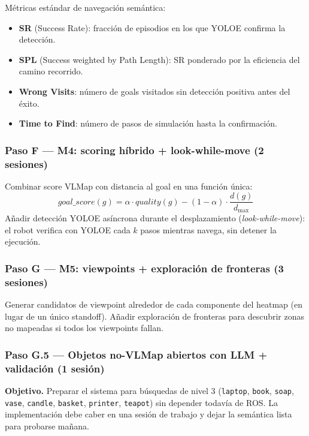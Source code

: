 \documentclass[11pt,a4paper]{article}
\begin{document}
Métricas estándar de navegación semántica:
\begin{itemize}
  \item \textbf{SR} (Success Rate): fracción de episodios en los que YOLOE confirma
        la detección.
  \item \textbf{SPL} (Success weighted by Path Length): SR ponderado por la eficiencia
        del camino recorrido.
  \item \textbf{Wrong Visits}: número de goals visitados sin detección positiva antes
        del éxito.
  \item \textbf{Time to Find}: número de pasos de simulación hasta la confirmación.
\end{itemize}

\subsubsection*{Paso F --- M4: scoring híbrido + look-while-move (2 sesiones)}

Combinar score VLMap con distancia al goal en una función única:
\[
  \textit{goal\_score}(g) = \alpha \cdot \textit{quality}(g)
                           - (1-\alpha) \cdot \frac{d(g)}{d_{\max}}
\]
Añadir detección YOLOE asíncrona durante el desplazamiento (\textit{look-while-move}):
el robot verifica con YOLOE cada $k$ pasos mientras navega, sin detener la ejecución.

\subsubsection*{Paso G --- M5: viewpoints + exploración de fronteras (3 sesiones)}

Generar candidatos de viewpoint alrededor de cada componente del heatmap (en lugar de
un único standoff). Añadir exploración de fronteras para descubrir zonas no mapeadas
si todos los viewpoints fallan.

\subsubsection*{Paso G.5 --- Objetos no-VLMap abiertos con LLM + validación (1 sesión)}

\textbf{Objetivo.} Preparar el sistema para búsquedas de nivel 3
(\texttt{laptop}, \texttt{book}, \texttt{soap}, \texttt{vase},
\texttt{candle}, \texttt{basket}, \texttt{printer}, \texttt{teapot}) sin
depender todavía de ROS. La implementación debe caber en una sesión de trabajo
y dejar la semántica lista para probarse mañana.
\end{document}
